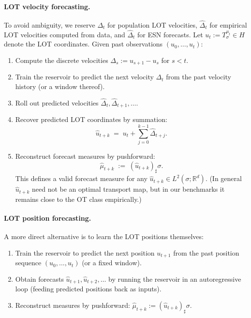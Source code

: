 \documentclass[11pt]{article}
\newcommand{\R}{\mathbb{R}}
\newcommand{\1}{\mathbf{1}}
\begin{document}
\paragraph{LOT velocity forecasting.}
To avoid ambiguity, we reserve $\Delta_t$ for population LOT velocities, $\hat{\Delta}_t$ for empirical LOT velocities computed from data, and $\widehat{\Delta}_t$ for ESN forecasts.
Let $u_t := T_\sigma^{\mu_t}\in H$ denote the LOT coordinates. Given past
observations $(u_0,\ldots,u_t)$:
\begin{enumerate}
\item Compute the discrete velocities $\Delta_s := u_{s+1}-u_s$ for $s<t$.
\item Train the reservoir to predict the next velocity $\Delta_t$ from the
past velocity history (or a window thereof).
\item Roll out predicted velocities $\widehat{\Delta}_t,\widehat{\Delta}_{t+1},\ldots$.
\item Recover predicted LOT coordinates by summation:
\[
\widehat{u}_{t+k} \;=\; u_t + \sum_{j=0}^{k-1}\widehat{\Delta}_{t+j}.
\]
\item Reconstruct forecast measures by pushforward:
\[
\widehat{\mu}_{t+k} \;:=\; (\widehat{u}_{t+k})_\sharp \sigma.
\]
This defines a valid forecast measure for any $\widehat{u}_{t+k}\in L^2(\sigma;\R^d)$.
(In general $\widehat{u}_{t+k}$ need not be an optimal transport map, but in our
benchmarks it remains close to the OT class empirically.)
\end{enumerate}

\paragraph{LOT position forecasting.}
A more direct alternative is to learn the LOT positions themselves:
\begin{enumerate}
\item Train the reservoir to predict the next position $u_{t+1}$ from the
past position sequence $(u_0,\ldots,u_t)$ (or a fixed window).
\item Obtain forecasts $\widehat{u}_{t+1},\widehat{u}_{t+2},\ldots$ by running the
reservoir in an autoregressive loop (feeding predicted positions back as inputs).
\item Reconstruct measures by pushforward: $\widehat{\mu}_{t+k} := (\widehat{u}_{t+k})_\sharp \sigma$. \\
\end{enumerate}
\end{document}
